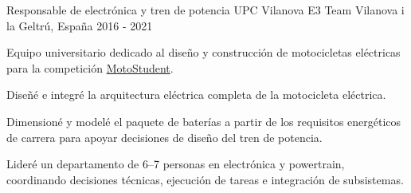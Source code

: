\cventry
  {Responsable de electr\'onica y tren de potencia}
  {UPC Vilanova E3 Team}
  {Vilanova i la Geltr\'u, Espa\~na}
  {2016 - 2021}
  {
    \begin{cvitems}
      \item {Equipo universitario dedicado al dise\~no y construcci\'on de motocicletas el\'ectricas para la competici\'on \href{https://www.motostudent.com/}{MotoStudent}.}
      \item {Dise\~n\'e e integr\'e la arquitectura el\'ectrica completa de la motocicleta el\'ectrica.}
      \item {Dimension\'e y model\'e el paquete de bater\'ias a partir de los requisitos energ\'eticos de carrera para apoyar decisiones de dise\~no del tren de potencia.}
      \item {Lider\'e un departamento de 6--7 personas en electr\'onica y powertrain, coordinando decisiones t\'ecnicas, ejecuci\'on de tareas e integraci\'on de subsistemas.}
    \end{cvitems}
  }

